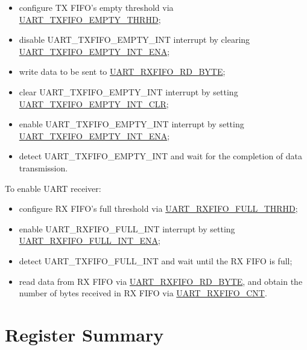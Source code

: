 \documentclass[main\_\_EN.tex]{subfiles}
\begin{document}
\begin{itemize}
    \item configure TX FIFO's empty threshold via \hyperref[fielddesc:UARTTXFIFOEMPTYTHRHD]{UART\_TXFIFO\_EMPTY\_THRHD};
    \item disable UART\_TXFIFO\_EMPTY\_INT interrupt by clearing \hyperref[fielddesc:UARTTXFIFOEMPTYINTENA]{UART\_TXFIFO\_EMPTY\_INT\_ENA};
    \item write data to be sent to \hyperref[fielddesc:UARTRXFIFORDBYTE]{UART\_RXFIFO\_RD\_BYTE};
    \item clear UART\_TXFIFO\_EMPTY\_INT interrupt by setting  \hyperref[fielddesc:UARTTXFIFOEMPTYINTCLR]{UART\_TXFIFO\_EMPTY\_INT\_CLR};
    \item enable UART\_TXFIFO\_EMPTY\_INT interrupt by setting \hyperref[fielddesc:UARTTXFIFOEMPTYINTENA]{UART\_TXFIFO\_EMPTY\_INT\_ENA};
    \item detect UART\_TXFIFO\_EMPTY\_INT and wait for the completion of data transmission.
\end{itemize}

To enable UART receiver:
\begin{itemize}
    \item configure RX FIFO's full threshold via \hyperref[fielddesc:UARTRXFIFOFULLTHRHD]{UART\_RXFIFO\_FULL\_THRHD};
    \item enable UART\_RXFIFO\_FULL\_INT interrupt by setting \hyperref[fielddesc:UARTRXFIFOFULLINTENA]{UART\_RXFIFO\_FULL\_INT\_ENA};
    \item detect UART\_TXFIFO\_FULL\_INT and wait until the RX FIFO is full;
    \item read data from RX FIFO via  \hyperref[fielddesc:UARTRXFIFORDBYTE]{UART\_RXFIFO\_RD\_BYTE}, and obtain the number of bytes received in RX FIFO via \hyperref[fielddesc:UARTRXFIFOCNT]{UART\_RXFIFO\_CNT}.
\end{itemize}





\clearpage
\hypertarget{uart-reg-summ}{}
\section{Register Summary}
\label{sec:uart-reg-summ}
\end{document}
